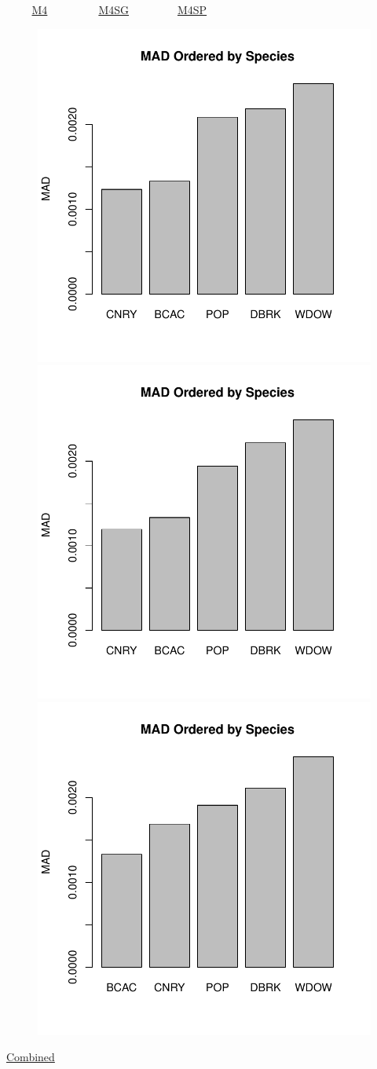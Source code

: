 \documentclass[ xcolor = pdftex, dvipsnames, table ]{beamer}
\begin{document}
\begin{frame}{$~~~~~~~~~$ \href{https://github.com/gasduster99/sppComp/tree/master/sscRuns/26919781982M4}{M4} $~~~~~~~~~~~~~~~~~~$ \href{https://github.com/gasduster99/sppComp/tree/master/sscRuns/26919781982M4IGSG}{M4SG} $~~~~~~~~~~~~~~~~~$ \href{https://github.com/gasduster99/sppComp/tree/master/sscRuns/26919781982M4IGSP}{M4SP} }
        \begin{figure}[ht!]
        \centering
        \hspace*{-1cm}
        \includegraphics[width=.4\textwidth]{../sscRuns/26919781982M4/sppTailMad68.pdf}
        \includegraphics[width=.4\textwidth]{../sscRuns/26919781982M4IGSG/sppTailMad68.pdf}
        \includegraphics[width=.4\textwidth]{../sscRuns/26919781982M4IGSP/sppTailMad68.pdf}
        \end{figure}
	\vspace{-1cm}
	\begin{center}
	\Large
	\href{https://github.com/gasduster99/sppComp/tree/master/try1/postSSC/26919781982M4IGSPSG}{Combined}
	\end{center}
\end{frame}
\end{document}
